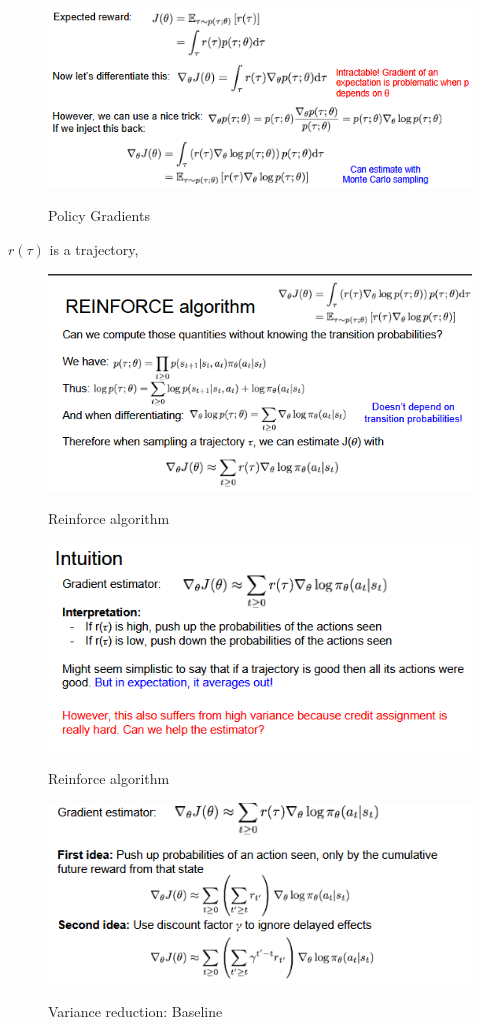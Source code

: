 \documentclass[11pt]{article}
\begin{document}
\begin{figure}[h]
\centering
\captionsetup{justification=centering}
\includegraphics[width=0.7\linewidth]{L1319.pdf}
\label{fig:1319}
\caption{Policy Gradients }
\end{figure}
$r(\tau)$ is a trajectory,
\clearpage
\begin{figure}[h]
\centering
\captionsetup{justification=centering}
\includegraphics[width=0.7\linewidth]{L1320.pdf}
\label{fig:1320}
\caption{Reinforce algorithm }
\end{figure}



\begin{figure}[h]
\centering
\captionsetup{justification=centering}
\includegraphics[width=0.7\linewidth]{L1321.pdf}
\label{fig:1321}
\caption{Reinforce algorithm }
\end{figure}

\begin{figure}[h]
\centering
\captionsetup{justification=centering}
\includegraphics[width=0.7\linewidth]{L1327.pdf}
\label{fig:1327}
\caption{Variance reduction: Baseline}
\end{figure}
\end{document}
